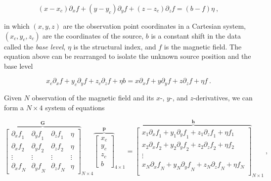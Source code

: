         \begin{equation}
        \label{eq_euler_homogeneity}
        (x - x_c)\partial_x f
        + (y - y_c)\partial_y f
        + (z - z_c)\partial_z f
        = (b - f)\eta
        \ ,
        \end{equation}
    
    \noindent
    in which $(x, y, z)$ are the observation point coordinates in a Cartesian system, $(x_c, y_c, z_c)$ are the coordinates of the source, $b$ is a constant shift in the data called the \textit{base level}, $\eta$ is the structural index, and $f$ is the magnetic field.
    The equation above can be rearranged to isolate the unknown source position  and the base level 
    
    \begin{equation}
    x_c \partial_x f + y_c \partial_y f + z_c \partial_z f + \eta b
    =
    x \partial_x f + y \partial_y f + z \partial_z f + \eta f
    \ .
    \end{equation}
    
    Given $N$ observation of the magnetic field and its $x$-, $y$-, and $z$-derivatives, we can form a $N \times 4$ system of equations
    
    \begin{equation}
    {\overbrace{
    \begin{bmatrix}
      {\partial_x f}_1 & {\partial_y f}_1 & {\partial_z f}_1 & \eta \\
      {\partial_x f}_2 & {\partial_y f}_2 & {\partial_z f}_2 & \eta \\
      \vdots & \vdots & \vdots & \vdots \\
      {\partial_x f}_N & {\partial_y f}_N & {\partial_z f}_N & \eta
    \end{bmatrix}
    }^{\mathbf{G}}}_{N \times 4}
    {\overbrace{
    \begin{bmatrix}
      x_c \\ y_c \\ z_c \\ b
    \end{bmatrix}
    }^{\mathbf{p}}}_{4 \times 1}
    =
    {\overbrace{
    \begin{bmatrix}
      x_1 {\partial_x f}_1 + y_1 {\partial_y f}_1 + z_1 {\partial_z f}_1 + \eta f_1 \\
      x_2 {\partial_x f}_2 + y_2 {\partial_y f}_2 + z_2 {\partial_z f}_2 + \eta f_2 \\
      \vdots \\
      x_N {\partial_x f}_N + y_N {\partial_y f}_N + z_N {\partial_z f}_N + \eta f_N \\
    \end{bmatrix}
    }^{\mathbf{h}}}_{N \times 1}
    \ ,
    \end{equation}


